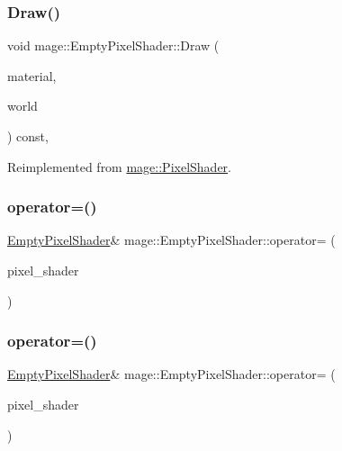 \subsubsection{\texorpdfstring{Draw()}{Draw()}}
{\footnotesize\ttfamily void mage\+::\+Empty\+Pixel\+Shader\+::\+Draw (\begin{DoxyParamCaption}\item[{const \hyperlink{structmage_1_1_material}{Material} \&}]{material,  }\item[{const \hyperlink{classmage_1_1_world}{World} \&}]{world }\end{DoxyParamCaption}) const\hspace{0.3cm}{\ttfamily [override]}, {\ttfamily [virtual]}}



Reimplemented from \hyperlink{classmage_1_1_pixel_shader_ac0506a453bf814b32aeb00819ec05806}{mage\+::\+Pixel\+Shader}.

\hypertarget{classmage_1_1_empty_pixel_shader_a7702fdae1d752ed422d1508e6ee08479}{}\label{classmage_1_1_empty_pixel_shader_a7702fdae1d752ed422d1508e6ee08479} 
\subsubsection{\texorpdfstring{operator=()}{operator=()}\hspace{0.1cm}{\footnotesize\ttfamily [1/2]}}
{\footnotesize\ttfamily \hyperlink{classmage_1_1_empty_pixel_shader}{Empty\+Pixel\+Shader}\& mage\+::\+Empty\+Pixel\+Shader\+::operator= (\begin{DoxyParamCaption}\item[{const \hyperlink{classmage_1_1_empty_pixel_shader}{Empty\+Pixel\+Shader} \&}]{pixel\+\_\+shader }\end{DoxyParamCaption})\hspace{0.3cm}{\ttfamily [delete]}}

\hypertarget{classmage_1_1_empty_pixel_shader_a5eee18735b5bc109ca63a913fa8e374d}{}\label{classmage_1_1_empty_pixel_shader_a5eee18735b5bc109ca63a913fa8e374d} 
\subsubsection{\texorpdfstring{operator=()}{operator=()}\hspace{0.1cm}{\footnotesize\ttfamily [2/2]}}
{\footnotesize\ttfamily \hyperlink{classmage_1_1_empty_pixel_shader}{Empty\+Pixel\+Shader}\& mage\+::\+Empty\+Pixel\+Shader\+::operator= (\begin{DoxyParamCaption}\item[{\hyperlink{classmage_1_1_empty_pixel_shader}{Empty\+Pixel\+Shader} \&\&}]{pixel\+\_\+shader }\end{DoxyParamCaption})\hspace{0.3cm}{\ttfamily [delete]}}

